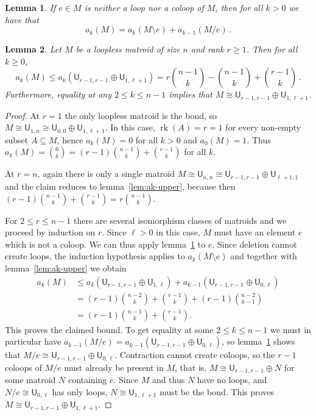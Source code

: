 \documentclass[10pt,a4paper]{amsart}
\newtheorem{lemma}{Lemma}
\newcommand{\UM}[2]{\mathsf{U}_{#2,#1}} %
\DeclareMathOperator{\rk}{rk}
\begin{document}
\begin{lemma}\label{lem:contract-delete}
    If $e\in M$ is neither a loop nor a coloop of $M$, then for all $k>0$ we have that
    \begin{equation*}
        a_k(M)=a_k(M\setminus e)+a_{k-1}(M/e)\,.
    \end{equation*}
\end{lemma}

\begin{lemma}\label{lem:upper-noloops}
    Let $M$ be a loopless matroid of size $n$ and rank $r\geq1$. Then for all $k\geq0$,
    \begin{equation*}
        a_k(M)\leq a_k(\UM{r-1}{r-1}\oplus \UM{\ell+1}{1})
        = r\binom{n-1}{k} -\binom{n-1}{k} + \binom{r-1}{k}
        \,.
    \end{equation*}
    Furthermore, equality at any $2\leq k\leq n-1$ implies that $M\cong\UM{r-1}{r-1}\oplus\UM{\ell+1}{1}$.
\end{lemma}

\begin{proof}
    At $r=1$ the only loopless matroid is the bond, so $M\cong \UM{n}{1}\cong \UM{0}{0}\oplus \UM{\ell+1}{1}$. In this case, $\rk(A)=r=1$ for every non-empty subset $A\subseteq M$, hence $a_k(M)=0$ for all $k>0$ and $a_0(M)=1$. Thus $a_k(M)=\binom{0}{k}=(r-1)\binom{n-1}{k}+\binom{r-1}{k}$ for all $k$.
    
    At $r=n$, again there is only a single matroid $M\cong\UM{n}{n}\cong\UM{r-1}{r-1}\oplus\UM{1}{\ell+1}$ and the claim reduces to lemma~\ref{lem:ak-upper}, because then $(r-1)\binom{n-1}{k}+\binom{r-1}{k}=r\binom{n-1}{k}$.

    For $2\leq r\leq n-1$ there are several isomorphism classes of matroids and we proceed by induction on $r$. Since $\ell>0$ in this case, $M$ must have an element $e$ which is not a coloop. We can thus apply lemma~\ref{lem:contract-delete} to $e$. Since deletion cannot create loops, the induction hypothesis applies to $a_k(M\setminus e)$ and together with lemma~\ref{lem:ak-upper} we obtain
    \begin{align*}
        a_k(M) &\leq a_k(\UM{r-1}{r-1}\oplus\UM{\ell}{1}) + a_{k-1}(\UM{r-1}{r-1}\oplus\UM{\ell}{0})
        \\ &= (r-1)\binom{n-2}{k} + \binom{r-1}{k} + (r-1)\binom{n-2}{k-1}
        \\ &= (r-1)\binom{n-1}{k} + \binom{r-1}{k}.
    \end{align*}
    This proves the claimed bound. To get equality at some $2\leq k\leq n-1$ we must in particular have $a_{k-1}(M/e)=a_{k-1}(\UM{r-1}{r-1}\oplus\UM{\ell}{0})$, so lemma~\ref{lem:contract-delete} shows that $M/e\cong \UM{r-1}{r-1}\oplus\UM{\ell}{0}$. Contraction cannot create coloops, so the $r-1$ coloops of $M/e$ must already be present in $M$, that is, $M\cong\UM{r-1}{r-1}\oplus N$ for some matroid $N$ containing $e$. Since $M$ and thus $N$ have no loops, and $N/e\cong\UM{\ell}{0}$ has only loops, $N\cong\UM{\ell+1}{1}$ must be the bond. This proves $M\cong \UM{r-1}{r-1}\oplus\UM{\ell+1}{1}$.
\end{proof}
\end{document}
